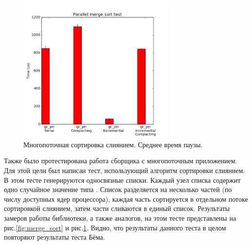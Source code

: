 \begin{figure}[ht!]
\centering
\includegraphics[width=0.7\textwidth]{Moiseenko/images/merge_sort_pause_all.png}
\caption{Многопоточная сортировка слиянием. Среднее время паузы.}
\label{fig:merge_sort_pause}
\end{figure}

Также было протестирована работа сборщика с многопоточным приложением. 
Для этой цели был написан тест, использующий алгоритм сортировки слиянием. 
В этом тесте генерируются односвязные списки. 
Каждый узел списка содержит одно случайное значение типа . 
Список разделяется на несколько частей (по числу доступных ядер процессора), 
каждая часть сортируется в отдельном потоке сортировкой слиянием, 
затем части сливаются в единый список. 
Результаты замеров работы библиотеки, а также аналогов, на этом тесте представлены 
на рис.\ref{fig:merge_sort} и рис.\ref{fig:merge_sort_pause}. 
Видно, что результаты данного теста в целом повторяют результаты теста Бёма. 